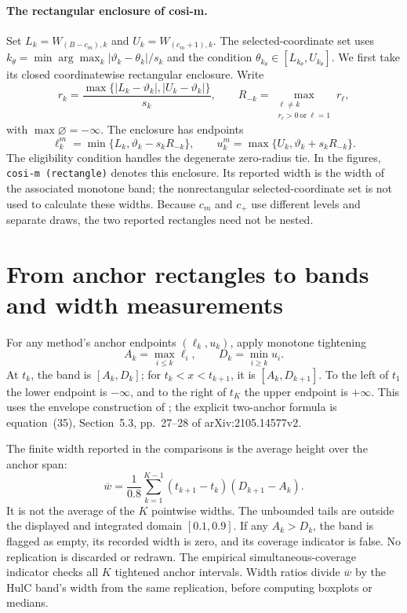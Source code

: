 \documentclass[10pt]{article}
\begin{document}
\paragraph{The rectangular enclosure of cosi-m.}
Set
$L_k=W_{(B-c_m),k}$ and $U_k=W_{(c_m+1),k}$. The selected-coordinate set uses
$k_\theta=\min\arg\max_k|\vartheta_k-\theta_k|/s_k$ and the condition $\theta_{k_\theta}\in[L_{k_\theta},U_{k_\theta}]$. We first take its closed coordinatewise rectangular enclosure. Write
\[
 r_k=\frac{\max\{|L_k-\vartheta_k|,|U_k-\vartheta_k|\}}{s_k},\qquad
 R_{-k}=\max_{\substack{\ell\ne k\\r_\ell>0\ \mathrm{or}\ \ell=1}}r_\ell,
\]
with $\max\varnothing=-\infty$. The enclosure has endpoints
\[
 \ell^m_k=\min\{L_k,\vartheta_k-s_kR_{-k}\},\qquad
 u^m_k=\max\{U_k,\vartheta_k+s_kR_{-k}\}.
\]
The eligibility condition handles the degenerate zero-radius tie. In the figures, \texttt{cosi-m (rectangle)} denotes this enclosure. Its reported width is the width of the associated monotone band; the nonrectangular selected-coordinate set is not used to calculate these widths. Because $c_m$ and $c_+$ use different levels and separate draws, the two reported rectangles need not be nested.

\section{From anchor rectangles to bands and width measurements}
For any method's anchor endpoints $(\ell_k,u_k)$, apply monotone tightening
\[
 A_k=\max_{i\le k}\ell_i,\qquad D_k=\min_{i\ge k}u_i.
\]
At $t_k$, the band is $[A_k,D_k]$; for $t_k<x<t_{k+1}$, it is $[A_k,D_{k+1}]$. To the left of $t_1$ the lower endpoint is $-\infty$, and to the right of $t_K$ the upper endpoint is $+\infty$. This uses the envelope construction of \cite{kuchibhotla2024hulc}; the explicit two-anchor formula is equation~(35), Section~5.3, pp.~27--28 of arXiv:2105.14577v2.

The finite width reported in the comparisons is the average height over the anchor span:
\[
 \overline w=\frac1{0.8}\sum_{k=1}^{K-1}(t_{k+1}-t_k)(D_{k+1}-A_k).
\]
It is not the average of the $K$ pointwise widths. The unbounded tails are outside the displayed and integrated domain $[0.1,0.9]$. If any $A_k>D_k$, the band is flagged as empty, its recorded width is zero, and its coverage indicator is false. No replication is discarded or redrawn. The empirical simultaneous-coverage indicator checks all $K$ tightened anchor intervals. Width ratios divide $\overline w$ by the HulC band's width from the same replication, before computing boxplots or medians.
\end{document}
